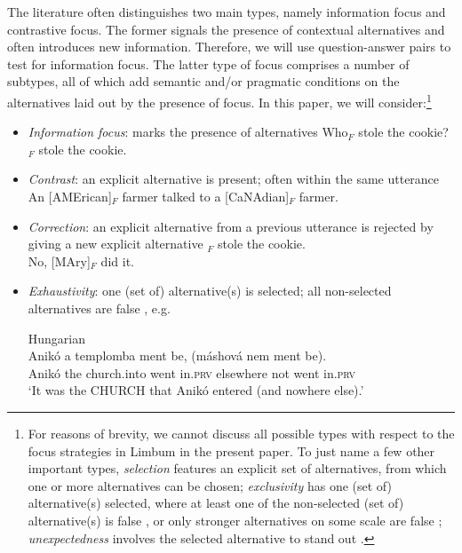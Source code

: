 \documentclass[output=paper,
modfonts
]{langscibook}
\begin{document}
The literature often distinguishes two main types, namely information focus and contrastive focus. The former signals the presence of contextual alternatives and often introduces new information. Therefore, we will use question-answer pairs to test for information focus. The latter type of focus comprises a number of subtypes, all of which add semantic and/or pragmatic conditions on the alternatives laid out by the presence of focus. In this paper, we will consider:\footnote{For reasons of brevity, we cannot discuss all possible types with respect to the focus strategies in Limbum in the present paper. To just name a few other important types, \textit{selection} features an explicit set of alternatives, from which one or more alternatives can be chosen; \textit{exclusivity} has one (set of) alternative(s) selected, where at least one of the non-selected (set of) alternative(s) is false \citep{vanderWal2011,vanderWal2014}, or only stronger alternatives on some scale are false \citep{Beaver2008,Coppock2012}; \textit{unexpectedness} involves the selected alternative to stand out \citep{Zimmermann2008,Zimmermann2011a,Hartmann2008,Skopeteas2009,Skopeteas2011,Frey2010,Zimmermann2011a,Destruel2014}. }
\begin{itemize}
\item \textit{Information focus}: marks the presence of alternatives
\ea Who$_F$ stole the cookie?\\ \relax[PEter]$_F$ stole the cookie. \z
\item \textit{Contrast}: an explicit alternative is present; often within the same utterance
\ea An [AMErican]$_F$ farmer talked to a [CaNAdian]$_F$ farmer. \z
\item \textit{Correction}: an explicit alternative from a previous utterance is rejected by giving a new explicit alternative
\ea \relax[PEter]$_F$ stole the cookie.\\ No, [MAry]$_F$ did it.\z
\item \textit{Exhaustivity}: one (set of) alternative(s) is selected; all non-selected alternatives are false \citep{Szabolcsi1981,Kiss1998,Vallduvi1998,Horvath2010,Horvath2013}, e.g.

\ea
Hungarian\\
\gll Anikó a templomba ment be, (máshová nem ment be).\\
Anikó the church.into went in.\textsc{prv} elsewhere not went in.\textsc{prv}\\
\glt `It was the CHURCH that Anikó entered (and nowhere else).'
\z 
\end{itemize}
\end{document}
